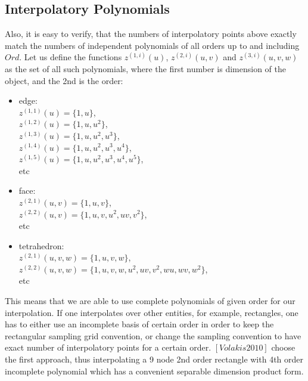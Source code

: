 \documentclass[12pt]{article}
\begin{document}
\subsection{Interpolatory Polynomials}
\label{section-interppoly}

\noindent
Also, it is easy to verify, that the numbers of interpolatory points above exactly match the numbers of independent polynomials of all orders up to and including $Ord$. Let us define the functions $z^{(1,i)}(u)$, $z^{(2,i)}(u,v)$ and $z^{(3,i)}(u,v,w)$ as the set of all such polynomials, where the first number is dimension of the object, and the 2nd is the order:
\begin{itemize}
	\item edge: \\
		$z^{(1,1)}(u) = \{1, u\}$, \\
		$z^{(1,2)}(u) = \{1, u, u^2\}$, \\
		$z^{(1,3)}(u) = \{1, u, u^2, u^3\}$, \\
		$z^{(1,4)}(u) = \{1, u, u^2, u^3, u^4\}$, \\
		$z^{(1,5)}(u) = \{1, u, u^2, u^3, u^4, u^5\}$, \\
		etc
	\item face:	\\
		$z^{(2,1)}(u,v)	= \{1, u, v\}$, \\
		$z^{(2,2)}(u,v) = \{1, u, v, u^2, uv, v^2\}$, \\
		etc
	\item tetrahedron: \\
		$z^{(2,1)}(u,v,w) = \{1, u, v, w\}$, \\ 
		$z^{(2,2)}(u,v,w) = \{1, u, v, w, u^2, uv, v^2, wu, wv, w^2\}$, \\
		etc
\end{itemize}

\noindent
This means that we are able to use complete polynomials of given order for our interpolation. If one interpolates over other entities, for example, rectangles, one has to either use an incomplete basis of certain order in order to keep the rectangular sampling grid convention, or change the sampling convention to have exact number of interpolatory points for a certain order. $[Volakis2010]$ choose the first approach, thus interpolating a 9 node 2nd order rectangle with 4th order incomplete polynomial which has a convenient separable dimension product form. \\
\end{document}
